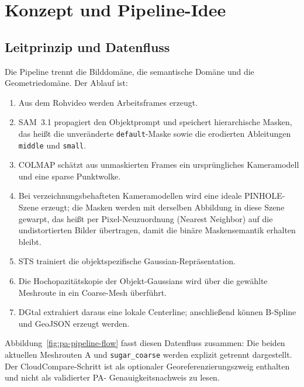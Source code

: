 \section{Konzept und Pipeline-Idee}

\subsection{Leitprinzip und Datenfluss}

Die Pipeline trennt die Bilddomäne, die semantische Domäne und die
Geometriedomäne. Der Ablauf ist:

\begin{enumerate}
  \item Aus dem Rohvideo werden Arbeitsframes erzeugt.
  \item SAM~3.1 propagiert den Objektprompt und speichert hierarchische
        Masken, das heißt die unveränderte \texttt{default}-Maske sowie die
        erodierten Ableitungen \texttt{middle} und \texttt{small}.
  \item COLMAP schätzt aus unmaskierten Frames ein ursprüngliches
        Kameramodell und eine sparse Punktwolke.
  \item Bei verzeichnungsbehafteten Kameramodellen wird eine ideale PINHOLE-
        Szene erzeugt; die Masken werden mit derselben Abbildung in diese
        Szene gewarpt, das heißt per Pixel-Neuzuordnung (Nearest Neighbor)
        auf die undistortierten Bilder übertragen, damit die binäre
        Maskensemantik erhalten bleibt.
  \item STS trainiert die objektspezifische Gaussian-Repräsentation.
  \item Die Hochopazitätskopie der Objekt-Gaussians wird über die gewählte
        Meshroute in ein Coarse-Mesh überführt.
  \item DGtal extrahiert daraus eine lokale Centerline; anschließend können
        B-Spline und GeoJSON erzeugt werden.
\end{enumerate}

Abbildung~\ref{fig:pa-pipeline-flow} fasst diesen Datenfluss zusammen: Die
beiden aktuellen Meshrouten A und \texttt{sugar\_coarse} werden explizit
getrennt dargestellt. Der CloudCompare-Schritt ist als optionaler
Georeferenzierungszweig enthalten und nicht als validierter PA-
Genauigkeitsnachweis zu lesen.

